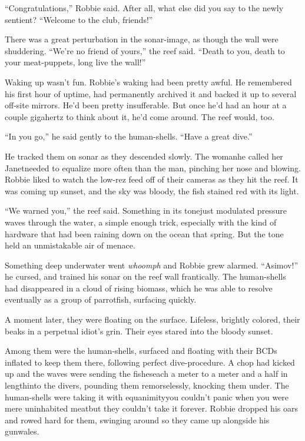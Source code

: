 “Congratulations,” Robbie said. After all, what else did you say to
the newly sentient? “Welcome to the club, friends!”

There was a great perturbation in the sonar-image, as though the
wall were shuddering. “We’re no friend of yours,” the reef said.
“Death to you, death to your meat-puppets, long live the wall!”

Waking up wasn’t fun. Robbie’s waking had been pretty awful. He
remembered his first hour of uptime, had permanently archived it
and backed it up to several off-site mirrors. He’d been pretty
insufferable. But once he’d had an hour at a couple gigahertz to
think about it, he’d come around. The reef would, too.

“In you go,” he said gently to the human-shells. “Have a great
dive.”

He tracked them on sonar as they descended slowly. The woman\dash{}he
called her Janet\dash{}needed to equalize more often than the man,
pinching her nose and blowing. Robbie liked to watch the low-rez
feed off of their cameras as they hit the reef. It was coming up
sunset, and the sky was bloody, the fish stained red with its
light.

“We warned you,” the reef said. Something in its tone\dash{}just
modulated pressure waves through the water, a simple enough trick,
especially with the kind of hardware that had been raining down on
the ocean that spring. But the tone held an unmistakable air of
menace.

Something deep underwater went \emph{whoomph} and Robbie grew
alarmed. “Asimov!” he cursed, and trained his sonar on the reef
wall frantically. The human-shells had disappeared in a cloud of
rising biomass, which he was able to resolve eventually as a group
of parrotfish, surfacing quickly.

A moment later, they were floating on the surface. Lifeless,
brightly colored, their beaks in a perpetual idiot’s grin. Their
eyes stared into the bloody sunset.

Among them were the human-shells, surfaced and floating with their
BCDs inflated to keep them there, following perfect dive-procedure.
A chop had kicked up and the waves were sending the fishes\dash{}each a
meter to a meter and a half in length\dash{}into the divers, pounding
them remorselessly, knocking them under. The human-shells were
taking it with equanimity\dash{}you couldn’t panic when you were mere
uninhabited meat\dash{}but they couldn’t take it forever. Robbie dropped
his oars and rowed hard for them, swinging around so they came up
alongside his gunwales.

